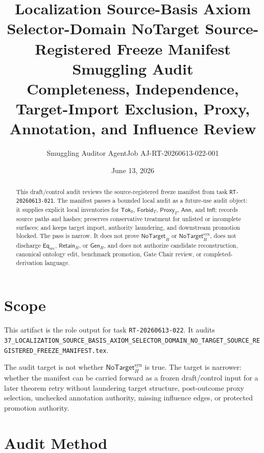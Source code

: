 \documentclass[11pt]{article}
\title{\textbf{Localization Source-Basis Axiom Selector-Domain NoTarget Source-Registered Freeze Manifest Smuggling Audit}\\[0.35em]
\large Completeness, Independence, Target-Import Exclusion, Proxy, Annotation, and Influence Review}
\author{Smuggling Auditor AgentJob AJ-RT-20260613-022-001}
\date{June 13, 2026}
\newcommand{\GenH}{\mathsf{Gen}_{H}}
\newcommand{\EqSrc}{\mathsf{Eq}_{\mathrm{src}}}
\newcommand{\RetainH}{\mathsf{Retain}_{H}}
\newcommand{\NoTargetH}{\mathsf{NoTarget}_{H}}
\newcommand{\NoTargetSyn}{\mathsf{NoTarget}_{H}^{\mathrm{syn}}}
\newcommand{\SrcTok}{\mathsf{Tok}_{0}}
\newcommand{\ForbidT}{\mathsf{Forbid}_{T}}
\newcommand{\ProxyT}{\mathsf{Proxy}_{T}}
\newcommand{\Annot}{\mathsf{Ann}}
\newcommand{\Influence}{\mathsf{Infl}}
\begin{document}
\maketitle

\begin{abstract}
This draft/control audit reviews the source-registered freeze manifest from
task \texttt{RT-20260613-021}. The manifest passes a bounded local audit as
a future-use audit object: it supplies explicit local inventories for
\(\SrcTok\), \(\ForbidT\), \(\ProxyT\), \(\Annot\), and \(\Influence\);
records source paths and hashes; preserves conservative treatment for
unlisted or incomplete surfaces; and keeps target import, authority
laundering, and downstream promotion blocked. The pass is narrow. It does
not prove \(\NoTargetH\) or \(\NoTargetSyn\), does not discharge
\(\EqSrc\), \(\RetainH\), or \(\GenH\), and does not authorize candidate
reconstruction, canonical ontology edit, benchmark promotion, Gate Chair
review, or completed-derivation language.
\end{abstract}

\section{Scope}

This artifact is the role output for task \texttt{RT-20260613-022}. It
audits
\texttt{37\_LOCALIZATION\_SOURCE\_BASIS\_AXIOM\_SELECTOR\_DOMAIN\_NO\_TARGET\_SOURCE\_REGISTERED\_FREEZE\_MANIFEST.tex}.

The audit target is not whether \(\NoTargetSyn\) is true. The target is
narrower: whether the manifest can be carried forward as a frozen
draft/control input for a later theorem retry without laundering target
structure, post-outcome proxy selection, unchecked annotation authority,
missing influence edges, or protected promotion authority.

\section{Audit Method}
\end{document}
